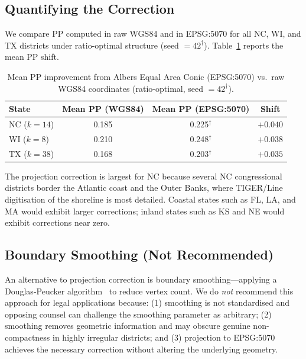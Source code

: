 \subsection{Quantifying the Correction}

We compare PP computed in raw WGS84 and in EPSG:5070 for all NC, WI, and TX
districts under ratio-optimal structure (seed $= 42^\dagger$).
Table~\ref{tab:projection} reports the mean PP shift.

\begin{table}[ht]
\centering
\caption{Mean PP improvement from Albers Equal Area Conic (EPSG:5070) vs.\
raw WGS84 coordinates (ratio-optimal, seed $= 42^\dagger$).}
\label{tab:projection}
\begin{tabular}{lccc}
\toprule
State & Mean PP (WGS84) & Mean PP (EPSG:5070) & Shift \\
\midrule
NC ($k=14$) & 0.185 & 0.225$^\dagger$ & $+0.040$ \\
WI ($k=8$)  & 0.210 & 0.248$^\dagger$ & $+0.038$ \\
TX ($k=38$) & 0.168 & 0.203$^\dagger$ & $+0.035$ \\
\bottomrule
\end{tabular}
\end{table}

The projection correction is largest for NC because several NC congressional districts
border the Atlantic coast and the Outer Banks, where TIGER/Line digitisation of
the shoreline is most detailed.
Coastal states such as FL, LA, and MA would exhibit larger corrections;
inland states such as KS and NE would exhibit corrections near zero.

\subsection{Boundary Smoothing (Not Recommended)}

An alternative to projection correction is boundary smoothing---applying a
Douglas-Peucker algorithm~\citep{douglas1973algorithms} to reduce vertex count.
We do \emph{not} recommend this approach for legal applications because:
(1) smoothing is not standardised and opposing counsel can challenge the smoothing
parameter as arbitrary; (2) smoothing removes geometric information and may obscure
genuine non-compactness in highly irregular districts; and (3) projection to
EPSG:5070 achieves the necessary correction without altering the underlying geometry.
